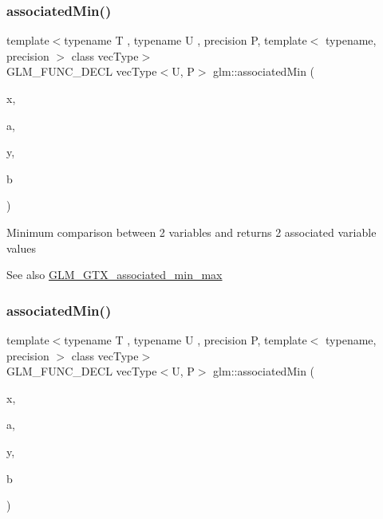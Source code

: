 \subsubsection{\texorpdfstring{associated\+Min()}{associatedMin()}\hspace{0.1cm}{\footnotesize\ttfamily [3/10]}}
{\footnotesize\ttfamily template$<$typename T , typename U , precision P, template$<$ typename, precision $>$ class vec\+Type$>$ \\
G\+L\+M\+\_\+\+F\+U\+N\+C\+\_\+\+D\+E\+CL vec\+Type$<$U, P$>$ glm\+::associated\+Min (\begin{DoxyParamCaption}\item[{T}]{x,  }\item[{const vec\+Type$<$ U, P $>$ \&}]{a,  }\item[{T}]{y,  }\item[{const vec\+Type$<$ U, P $>$ \&}]{b }\end{DoxyParamCaption})}

Minimum comparison between 2 variables and returns 2 associated variable values \begin{DoxySeeAlso}{See also}
\hyperlink{group__gtx__associated__min__max}{G\+L\+M\+\_\+\+G\+T\+X\+\_\+associated\+\_\+min\+\_\+max} 
\end{DoxySeeAlso}
\mbox{\label{group__gtx__associated__min__max_ga076717f4e07c6ae725cc1382d1ac4869}} 
\subsubsection{\texorpdfstring{associated\+Min()}{associatedMin()}\hspace{0.1cm}{\footnotesize\ttfamily [4/10]}}
{\footnotesize\ttfamily template$<$typename T , typename U , precision P, template$<$ typename, precision $>$ class vec\+Type$>$ \\
G\+L\+M\+\_\+\+F\+U\+N\+C\+\_\+\+D\+E\+CL vec\+Type$<$U, P$>$ glm\+::associated\+Min (\begin{DoxyParamCaption}\item[{vec\+Type$<$ T, P $>$ const \&}]{x,  }\item[{U}]{a,  }\item[{vec\+Type$<$ T, P $>$ const \&}]{y,  }\item[{U}]{b }\end{DoxyParamCaption})}


